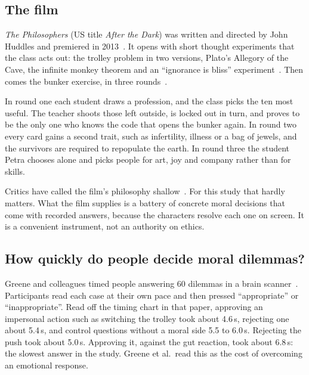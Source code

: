 \documentclass[journal]{IEEEtran}
\begin{document}
\subsection{The film}

\emph{The Philosophers} (US title \emph{After the Dark}) was written and directed by John Huddles
and premiered in 2013~\cite{huddles2013,wikipedia_afterdark}. It opens with short thought
experiments that the class acts out: the trolley problem in two versions, Plato's Allegory of the
Cave, the infinite monkey theorem and an \enquote{ignorance is bliss}
experiment~\cite{lovepirate2014,horizonfringe2014,conmose2016}. Then comes the bunker exercise, in
three rounds~\cite{wikipedia_afterdark,blimey_explained,collider_afterdark}.

In round one each student draws a profession, and the class picks the ten most useful. The teacher
shoots those left outside, is locked out in turn, and proves to be the only one who knows the code
that opens the bunker again. In round two every card gains a second trait, such as infertility,
illness or a bag of jewels, and the survivors are required to repopulate the earth. In round three
the student Petra chooses alone and picks people for art, joy and company rather than for skills.

Critics have called the film's philosophy shallow~\cite{philosophyinfilm2018,horizonfringe2014,neverfeltbetter2014}.
For this study that hardly matters. What the film supplies is a battery of concrete moral decisions
that come with recorded answers, because the characters resolve each one on screen. It is a
convenient instrument, not an authority on ethics.


\subsection{How quickly do people decide moral dilemmas?}

Greene and colleagues timed people answering 60 dilemmas in a brain scanner~\cite{greene2001}.
Participants read each case at their own pace and then pressed \enquote{appropriate} or
\enquote{inappropriate}. Read off the timing chart in that paper, approving an impersonal action such as switching
the trolley took about 4.6\,s, rejecting one about 5.4\,s, and control questions without a moral
side 5.5 to 6.0\,s. Rejecting the push took about 5.0\,s. Approving it, against the gut reaction,
took about 6.8\,s: the slowest answer in the study. Greene et al.\ read this as the cost of
overcoming an emotional response.
\end{document}
